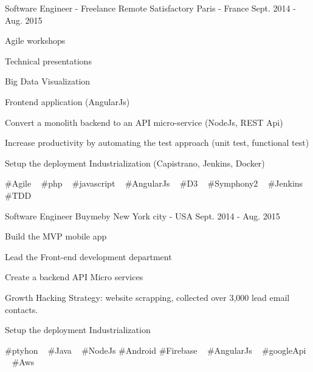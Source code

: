 \begin{cventries}
  \cventry
    {Software Engineer - Freelance Remote} %
    {Satisfactory} %
    {Paris - France} %
    {Sept. 2014 - Aug. 2015} %
    {
      \begin{cvitems} %
        \item {Agile workshops}
        \item {Technical presentations}
        \item {Big Data Visualization}
        \item {Frontend application (AngularJs)}
        \item {Convert a monolith backend to an API micro-service (NodeJs, REST Api)}
        \item {Increase productivity by automating the test approach (unit test, functional test)}
        \item {Setup the deployment Industrialization (Capistrano, Jenkins, Docker)}
      \end{cvitems}
    }
    {
      \#Agile ~
      \#php ~
      \#javascript ~
      \#AngularJs ~
      \#D3 ~
      \#Symphony2 ~
      \#Jenkins ~
      \#TDD 
    }

  \cventry
    {Software Engineer} %
    {Buymeby} %
    {New York city - USA} %
    {Sept. 2014 - Aug. 2015} %
    {
      \begin{cvitems} %
        \item {Build the MVP mobile app}
        \item {Lead the Front-end development department}
        \item {Create a backend API Micro services}
        \item {Growth Hacking Strategy: website scrapping, collected over 3,000 lead email contacts.}
        \item {Setup the deployment Industrialization}
      \end{cvitems}
    }
    {
      \#ptyhon ~
      \#Java ~
      \#NodeJs
      \#Android
      \#Firebase ~
      \#AngularJs ~
      \#googleApi ~
      \#Aws ~
    }


\end{cventries}
